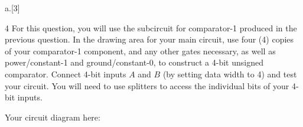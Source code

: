 \begin{question}{a.}[3]
  \item[4] For this question, you will use the subcircuit for comparator-1 produced in the previous question. In the drawing area for your main circuit, use four (4) copies of your comparator-1 component, and any other gates necessary, as well as power/constant-1 and ground/constant-0, to construct a 4-bit unsigned comparator. Connect 4-bit inputs $A$ and $B$ (by setting data width to 4) and test your circuit. You will need to use splitters to access the individual bits of your 4-bit inputs.
  
  Your circuit diagram here:
  
  \vspace {6.0cm}
  
\end{question}

\newpage


